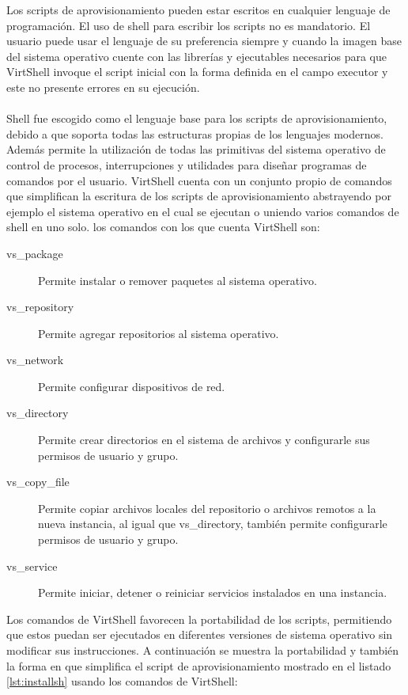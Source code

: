 \vspace{5mm}

Los scripts de aprovisionamiento pueden estar escritos en cualquier lenguaje de programación. El uso de shell para escribir los scripts no es mandatorio. El usuario puede usar el lenguaje de su preferencia siempre y cuando la imagen base del sistema operativo cuente con las librerías y ejecutables necesarios para que VirtShell invoque el script inicial con la forma definida en el campo executor y este no presente errores en su ejecución.\\
\\
Shell fue escogido como el lenguaje base para los scripts de aprovisionamiento, debido a que soporta todas las estructuras propias de los lenguajes modernos. Además permite la utilización de todas las primitivas del sistema operativo de control de procesos, interrupciones y utilidades para diseñar programas de comandos por el usuario. VirtShell cuenta con un conjunto propio de comandos que simplifican la escritura de los scripts de aprovisionamiento abstrayendo por ejemplo el sistema operativo en el cual se ejecutan o uniendo varios comandos de shell en uno solo. los comandos con los que cuenta VirtShell son:

\vspace{3mm}

\begin{description}
\item [vs\_package] Permite instalar o remover paquetes al sistema operativo.
\item [vs\_repository] Permite agregar repositorios al sistema operativo.
\item [vs\_network] Permite configurar dispositivos de red.
\item [vs\_directory] Permite crear directorios en el sistema de archivos y configurarle sus permisos de usuario y grupo.
\item [vs\_copy\_file] Permite copiar archivos locales del repositorio o archivos remotos a la nueva instancia, al igual que vs\_directory, también permite configurarle permisos de usuario y grupo.
\item [vs\_service] Permite iniciar, detener o reiniciar servicios instalados en una instancia.
\end{description}

\vspace{3mm}

Los comandos de VirtShell favorecen la portabilidad de los scripts, permitiendo que estos puedan ser ejecutados en diferentes versiones de sistema operativo sin modificar sus instrucciones. A continuación se muestra la portabilidad y también la forma en que simplifica el script de aprovisionamiento mostrado en el listado \ref{lst:installsh} usando los comandos de VirtShell:

